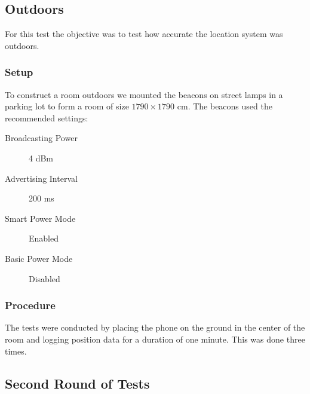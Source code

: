 \subsection{Outdoors}
For this test the objective was to test how accurate the location system was outdoors.

\subsubsection*{Setup}
To construct a room outdoors we mounted the beacons on street lamps in a parking lot to form a room of size $1790\times 1790$ cm. The beacons used the recommended settings\cite{estimote:settings}:
\begin{description}
    \item[Broadcasting Power]{4 dBm}
    \item[Advertising Interval]{200 ms}
    \item[Smart Power Mode]{Enabled}
    \item[Basic Power Mode]{Disabled}
\end{description}

\subsubsection*{Procedure}
The tests were conducted by placing the phone on the ground in the center of the room and logging position data for a duration of one minute.
This was done three times.

\subsection{Second Round of Tests}

